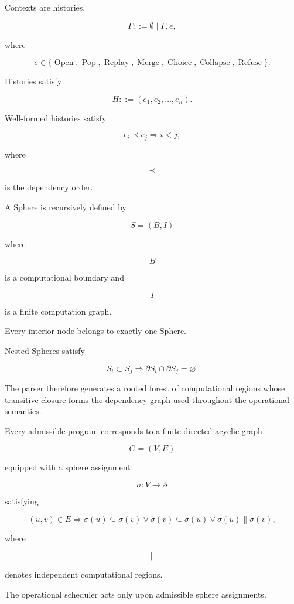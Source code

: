 \documentclass[12pt,oneside]{article}
\theoremstyle{definition}
\theoremstyle{remark}
\begin{document}
Contexts are histories,

\[
\Gamma
::=
\emptyset
\mid
\Gamma,e,
\]

where

\[
e
\in
\{
\operatorname{Open},
\operatorname{Pop},
\operatorname{Replay},
\operatorname{Merge},
\operatorname{Choice},
\operatorname{Collapse},
\operatorname{Refuse}
\}.
\]

Histories satisfy

\[
H
::=
(e_1,e_2,\ldots,e_n).
\]

Well-formed histories satisfy

\[
e_i
\prec
e_j
\Longrightarrow
i<j,
\]

where

\[
\prec
\]

is the dependency order.

A Sphere is recursively defined by

\[
S=(B,I)
\]

where

\[
B
\]

is a computational boundary and

\[
I
\]

is a finite computation graph.

Every interior node belongs to exactly one Sphere.

Nested Spheres satisfy

\[
S_i
\subset
S_j
\Longrightarrow
\partial S_i
\cap
\partial S_j
=
\varnothing.
\]

The parser therefore generates a rooted forest of computational regions whose
transitive closure forms the dependency graph used throughout the operational
semantics.

Every admissible program corresponds to a finite directed acyclic graph

\[
G=(V,E)
\]

equipped with a sphere assignment

\[
\sigma
:
V
\rightarrow
\mathcal S
\]

satisfying

\[
(u,v)\in E
\Longrightarrow
\sigma(u)
\subseteq
\sigma(v)
\vee
\sigma(v)
\subseteq
\sigma(u)
\vee
\sigma(u)
\parallel
\sigma(v),
\]

where

\[
\parallel
\]

denotes independent computational regions.

The operational scheduler acts only upon admissible sphere assignments.
\end{document}
